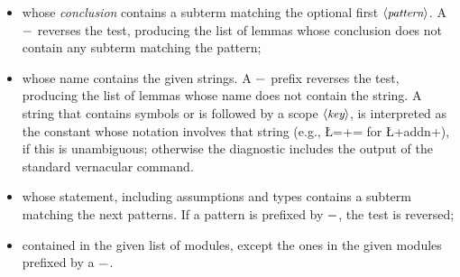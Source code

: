 \begin{itemize}
\item whose \emph{conclusion} contains a subterm matching the optional
  first $\langle\mbox{\itshape\rmfamily\small pattern}\rangle$. A $\C{-}$ reverses the test, producing the list
  of lemmas whose conclusion does not contain any subterm matching
  the pattern;
\item whose name contains the given strings. A $\C{-}$ prefix reverses
  the test, producing the list of lemmas whose name does not contain the
  string. A string that contains symbols or
is followed by a scope $\langle\mbox{\itshape\rmfamily\small key}\rangle$, is interpreted as the constant whose
notation involves that string (e.g., \L=+= for \L+addn+), if this is
unambiguous; otherwise the diagnostic includes the output of the
 standard vernacular command.

\item whose statement, including assumptions and types contains a
  subterm matching the next patterns. If a pattern is prefixed by
  $\C{-}$, the test is reversed;
\item contained in the given list of modules, except the ones in the
  given modules prefixed by a $\C{-}$.
\end{itemize}

